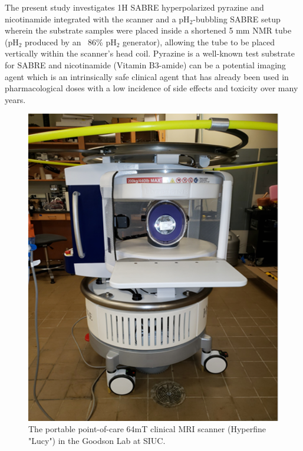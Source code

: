 \documentclass[final,3p,times,twocolumn]{elsarticle}
\begin{document}
\par The present study investigates 1H SABRE hyperpolarized pyrazine and nicotinamide integrated with the scanner and a pH$_{\mathrm{2}}$-bubbling SABRE setup\cite{truong2014irreversible} wherein the substrate samples were placed inside a shortened 5 mm NMR tube (pH$_{\mathrm{2}}$ produced by an ~86\% pH$_{\mathrm{2}}$ generator\cite{birchall2020high}), allowing the tube to be placed vertically within the scanner’s head coil. Pyrazine is a well-known test substrate for SABRE and nicotinamide (Vitamin B3-amide) can be a potential imaging agent which is an intrinsically safe clinical agent that has already been used in pharmacological doses with a low incidence of side effects and toxicity over many years\cite{cosmetic2005final}.

\begin{figure}
    \centering
    \includegraphics[width=\linewidth]{mri.png}
    \caption{The portable point-of-care 64mT clinical MRI scanner (Hyperfine "Lucy") in the Goodson Lab at SIUC. }
    \label{fig:my_label}
\end{figure}
\end{document}
